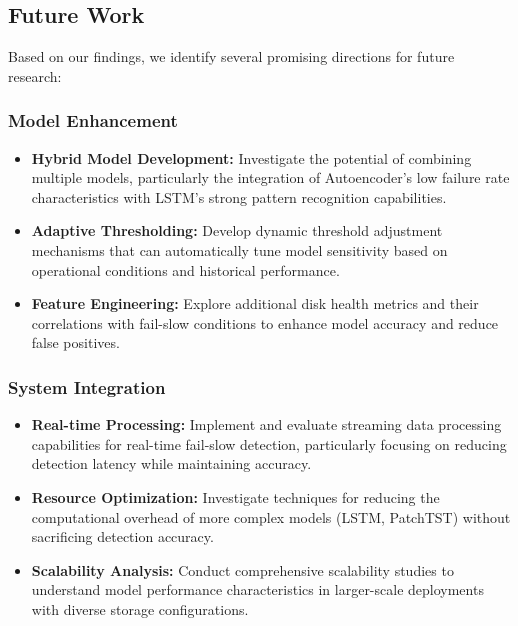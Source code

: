 \documentclass{article}
\begin{document}
\subsection{Future Work}
Based on our findings, we identify several promising directions for future research:

\subsubsection{Model Enhancement}
\begin{itemize}
    \item \textbf{Hybrid Model Development:} Investigate the potential of combining multiple models, particularly the integration of Autoencoder's low failure rate characteristics with LSTM's strong pattern recognition capabilities.
    
    \item \textbf{Adaptive Thresholding:} Develop dynamic threshold adjustment mechanisms that can automatically tune model sensitivity based on operational conditions and historical performance.
    
    \item \textbf{Feature Engineering:} Explore additional disk health metrics and their correlations with fail-slow conditions to enhance model accuracy and reduce false positives.
\end{itemize}

\subsubsection{System Integration}
\begin{itemize}
    \item \textbf{Real-time Processing:} Implement and evaluate streaming data processing capabilities for real-time fail-slow detection, particularly focusing on reducing detection latency while maintaining accuracy.
    
    \item \textbf{Resource Optimization:} Investigate techniques for reducing the computational overhead of more complex models (LSTM, PatchTST) without sacrificing detection accuracy.
    
    \item \textbf{Scalability Analysis:} Conduct comprehensive scalability studies to understand model performance characteristics in larger-scale deployments with diverse storage configurations.
\end{itemize}
\end{document}
